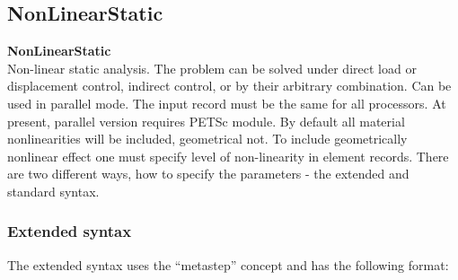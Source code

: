 \documentclass[a4paper]{article}
\newcommand{\entKeywordInst}[1]{\textbf{#1}} %
\newcommand{\Pmode}[1]{{\sffamily #1}}
\begin{document}
\subsection{NonLinearStatic}
\label{NonLinearStatic}
\entKeywordInst{NonLinearStatic} \\
Non-linear static analysis. The problem can be solved under
direct load or displacement control, indirect control, or by
their arbitrary combination.
\Pmode{Can be used in parallel mode. The input record must be the same
for all processors. At present, parallel version requires PETSc module.}
By default all
material nonlinearities will be included, geometrical not.
To include geometrically nonlinear effect one must specify
level of non-linearity in element records.
There are two different ways, how to specify the parameters - the
extended and standard syntax.
\subsubsection{Extended syntax}
The extended syntax uses the ``metastep'' concept and has the
following format:
\end{document}
